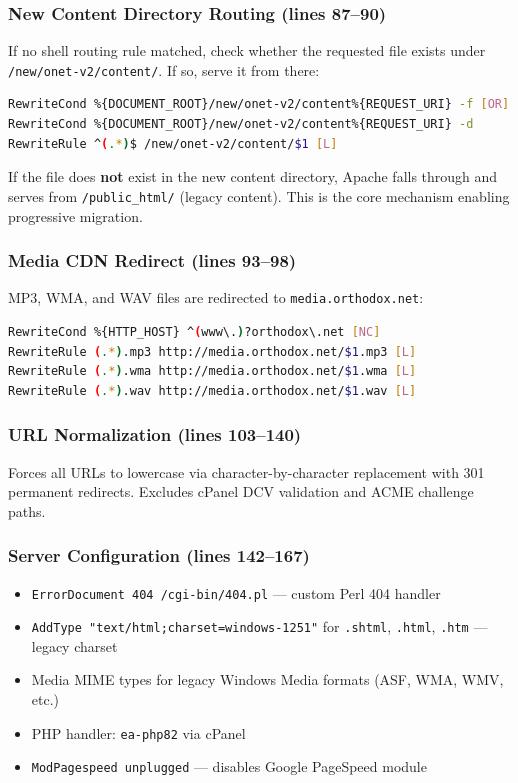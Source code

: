 \documentclass[12pt]{article}
\begin{document}
\subsubsection{New Content Directory Routing (lines 87--90)}

If no shell routing rule matched, check whether the requested file exists under
\texttt{/new/onet-v2/content/}. If so, serve it from there:

\begin{lstlisting}[language=bash,numbers=none,basicstyle=\ttfamily\footnotesize]
RewriteCond %{DOCUMENT_ROOT}/new/onet-v2/content%{REQUEST_URI} -f [OR]
RewriteCond %{DOCUMENT_ROOT}/new/onet-v2/content%{REQUEST_URI} -d
RewriteRule ^(.*)$ /new/onet-v2/content/$1 [L]
\end{lstlisting}

If the file does \textbf{not} exist in the new content directory, Apache falls through and serves from \texttt{/public\_html/} (legacy content). This is the core mechanism enabling progressive migration.

\subsubsection{Media CDN Redirect (lines 93--98)}

MP3, WMA, and WAV files are redirected to \texttt{media.orthodox.net}:

\begin{lstlisting}[language=bash,numbers=none]
RewriteCond %{HTTP_HOST} ^(www\.)?orthodox\.net [NC]
RewriteRule (.*).mp3 http://media.orthodox.net/$1.mp3 [L]
RewriteRule (.*).wma http://media.orthodox.net/$1.wma [L]
RewriteRule (.*).wav http://media.orthodox.net/$1.wav [L]
\end{lstlisting}

\subsubsection{URL Normalization (lines 103--140)}

Forces all URLs to lowercase via character-by-character replacement with 301 permanent redirects. Excludes cPanel DCV validation and ACME challenge paths.

\subsubsection{Server Configuration (lines 142--167)}

\begin{itemize}
    \item \texttt{ErrorDocument 404 /cgi-bin/404.pl} --- custom Perl 404 handler
    \item \texttt{AddType "text/html;charset=windows-1251"} for \texttt{.shtml}, \texttt{.html}, \texttt{.htm} --- legacy charset
    \item Media MIME types for legacy Windows Media formats (ASF, WMA, WMV, etc.)
    \item PHP handler: \texttt{ea-php82} via cPanel
    \item \texttt{ModPagespeed unplugged} --- disables Google PageSpeed module
\end{itemize}
\end{document}
